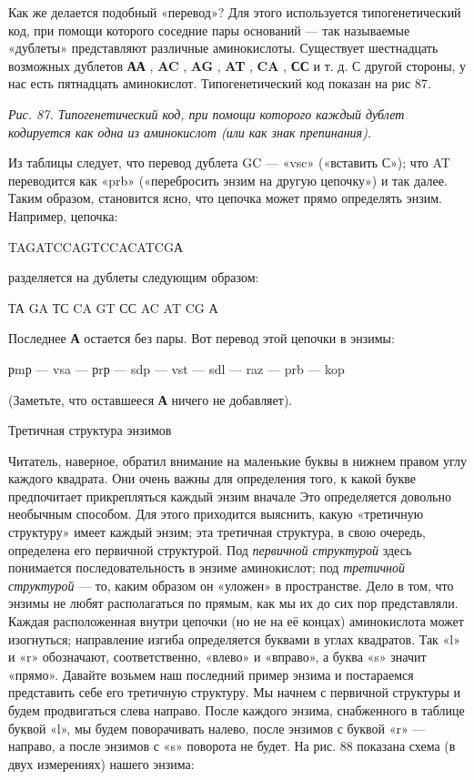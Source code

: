 \documentclass[../main.tex]{subfiles}
\begin{document}
Как же делается подобный «перевод»? Для этого используется типогенетический код, при помощи которого соседние пары оснований --- так называемые «дублеты» представляют различные аминокислоты. Существует шестнадцать возможных дублетов \textbf{АА} , \textbf{AC} , \textbf{AG} , \textbf{AT} , \textbf{CA} , \textbf{СС} и т. д. С другой стороны, у нас есть пятнадцать аминокислот. Типогенетический код показан на рис 87.

\emph{Рис. 87. Типогенетический код, при помощи которого каждый дублет кодируется как одна из аминокислот (или как знак препинания).}

Из таблицы следует, что перевод дублета GC --- «vsc» («вставить С»); что AT переводится как «prb» («перебросить энзим на другую цепочку») и так далее. Таким образом, становится ясно, что цепочка может прямо определять энзим. Например, цепочка:

TAGATCCAGTCCACATCGА

разделяется на дублеты следующим образом:

ТА GA ТС CA GT СС AC AT CG А

Последнее \textbf{А} остается без пары. Вот перевод этой цепочки в энзимы:

рmр --- vsa --- рrр --- sdp --- vst --- sdl --- raz --- prb --- kop

(Заметьте, что оставшееся \textbf{А} ничего не добавляет).

Третичная структура энзимов

Читатель, наверное, обратил внимание на маленькие буквы в нижнем правом углу каждого квадрата. Они очень важны для определения того, к какой букве предпочитает прикрепляться каждый энзим вначале Это определяется довольно необычным способом. Для этого приходится выяснить, какую «третичную структуру» имеет каждый энзим; эта третичная структура, в свою очередь, определена его первичной структурой. Под \emph{первичной структурой} здесь понимается последовательность в энзиме аминокислот; под \emph{третичной структурой} --- то, каким образом он «уложен» в пространстве. Дело в том, что энзимы не любят располагаться по прямым, как мы их до сих пор представляли. Каждая расположенная внутри цепочки (но не на её концах) аминокислота может изогнуться; направление изгиба определяется буквами в углах квадратов. Так «l» и «r» обозначают, соответственно, «влево» и «вправо», а буква «s» значит «прямо». Давайте возьмем наш последний пример энзима и постараемся представить себе его третичную структуру. Мы начнем с первичной структуры и будем продвигаться слева направо. После каждого энзима, снабженного в таблице буквой «l», мы будем поворачивать налево, после энзимов с буквой «r» --- направо, а после энзимов с «s» поворота не будет. На рис. 88 показана схема (в двух измерениях) нашего энзима:
\end{document}
